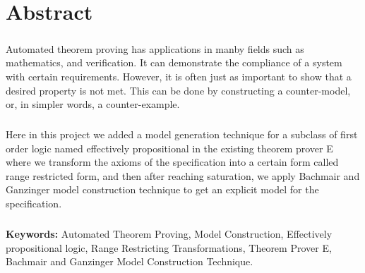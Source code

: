 \chapter*{Abstract}
\label{chap:abstract}


\begin{comment}
In the past few decades the field of automated theorem proving (ATP) has been flourishing and improving a lot by the enormous amount of research devoted to it. That interest came from its importance as well as its various uses in different fields such as mathematical reasoning.



ATP comes along with another process which is model generation/computation/construction from a certain (counter) satisfiable specification/problem. Model generation has usages that ATP alone wont have the effect that it has with it, and that could be noticed in Software/Hardware verification, debugging various systems.
\end{comment}



\paragraph{}
Automated theorem proving has applications in manby fields such as mathematics, and verification. It can demonstrate the compliance of a system with certain requirements. However, it is often just as important to show that a desired property is not met. This can be done by constructing a counter-model, or, in simpler words, a counter-example.


\paragraph{}
Here in this project we added a model generation technique for a subclass of first order logic named effectively propositional in the existing theorem prover E where we transform the axioms of the specification into a certain form called range restricted form, and then after reaching saturation, we apply Bachmair and Ganzinger model construction technique to get an explicit model for the specification.


\paragraph{}
\textbf{Keywords:} Automated Theorem Proving, Model Construction, Effectively propositional logic, Range Restricting Transformations, Theorem Prover E, Bachmair and Ganzinger Model Construction Technique.  